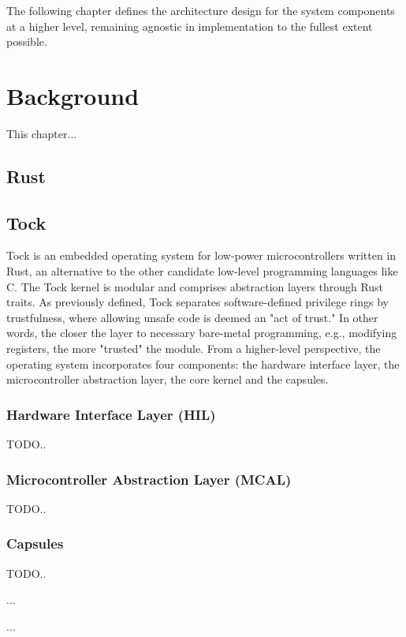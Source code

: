 \documentclass[12pt,a4paper]{report}
\begin{document}
The following chapter defines the architecture design for the system components at a higher level, remaining agnostic in implementation to the fullest extent possible.

\chapter{Background}\pagestyle{fancy}

This chapter...

\section{Rust}

\section{Tock}

Tock is an embedded operating system for low-power microcontrollers written in Rust, an alternative to the other candidate low-level programming languages like C. The Tock kernel is modular and comprises abstraction layers through Rust traits. As previously defined, Tock separates software-defined privilege rings by trustfulness, where allowing unsafe code is deemed an "act of trust." In other words, the closer the layer to necessary bare-metal programming, e.g., modifying registers, the more "trusted" the module. From a higher-level perspective, the operating system incorporates four components: the hardware interface layer, the microcontroller abstraction layer, the core kernel and the capsules.

\subsection{Hardware Interface Layer (HIL)}

TODO..

\subsection{Microcontroller Abstraction Layer (MCAL)}

TODO..

\subsection{Capsules}

TODO..

...

...
\end{document}
